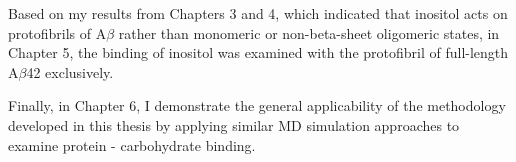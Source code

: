 Based on my results from Chapters 3 and 4, which indicated that inositol acts on protofibrils of A$\beta$ rather than monomeric or non-beta-sheet oligomeric states, in Chapter 5, the binding of inositol was examined with the protofibril of full-length A$\beta$42 exclusively.

Finally, in Chapter 6, I demonstrate the general applicability of the methodology developed in this thesis by applying similar MD simulation approaches to examine protein - carbohydrate binding. 


\begin{singlespace}


\end{singlespace}

%


%
%

